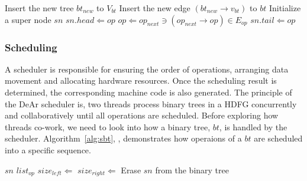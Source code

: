 \documentclass[12pt]{article}
\begin{document}
\begin{CJK}{UTF8}{bkai}
\begin{algorithm}[h!]
\begin{algorithmic}[1]
                        \State      Insert the new tree $bt_{new}$ to $V_{bt}$
                        \State      Insert the new edge $(bt_{new} \rightarrow v_{bt})$ to $bt$ \label{line:growelsee}
                        \EndIf                          \label{line:gbte}
                \EndIf
            \EndFunction
            \Statex %
              \label{line:bsns}
                \State  Initialize a super node $sn$ 
                \State  $sn.head \Leftarrow op$
                    \State   $op \Leftarrow op_{next} \ni (op_{next} \rightarrow op) \in E_{op}$ 
                \EndWhile
                \State  $sn.tail \Leftarrow op$
                \State      {}
            \EndFunction                        \label{line:bsne}
        \end{algorithmic}
        \label{alg:tohdfg}
        \end{algorithm}

    
        \subsubsection{Scheduling}

        A scheduler is responsible for ensuring the order of operations, 
        arranging data movement and allocating hardware resources.
        Once the scheduling result is determined, the corresponding machine code is also generated.
        The principle of the DeAr scheduler is, 
        two threads process binary trees in a HDFG concurrently and collaboratively until all operations are scheduled.
        Before exploring how threads co-work, we need to look into how a binary tree, $bt$, is handled by the scheduler.
        Algorithm~\ref{alg:sbt}, , 
        demonstrates how operaions of a $bt$ are scheduled into a specific sequence.
\begin{algorithm}[h]
    \caption{}
    \begin{algorithmic}[1]
        \Require    $sn$
        \Ensure     $list_{op}$
                \label{line:sbts}
            \State $size_{left} \Leftarrow$ 
            \State $size_{right} \Leftarrow$ 
                \State {}
            \Else
                \State {}
            \EndIf
        \EndIf
        \State {}   
        \State Erase $sn$ from the binary tree
            \State {}
        \EndIf


\end{algorithmic}
\end{algorithm}
\end{CJK}
\end{document}
